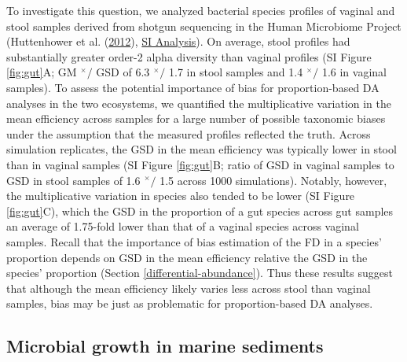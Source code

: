 \documentclass[
]{article}
\newcommand{\md}{^{\times}\!/}
\begin{document}
To investigate this question, we analyzed bacterial species profiles of vaginal and stool samples derived from shotgun sequencing in the Human Microbiome Project
(Huttenhower et al. (\protect\hyperlink{ref-huttenhower2012stru}{2012}), \href{https://mikemc.github.io/differential-abundance-theory/notebook/posts/2022-01-30-hmp-stool-vagina-comparison/}{SI Analysis}).
On average, stool profiles had substantially greater order-2 alpha diversity than vaginal profiles (SI Figure \ref{fig:gut}A; GM \(\md\) GSD of 6.3 \(\md\) 1.7 in stool samples and 1.4 \(\md\) 1.6 in vaginal samples).
To assess the potential importance of bias for proportion-based DA analyses in the two ecosystems, we quantified the multiplicative variation in the mean efficiency across samples for a large number of possible taxonomic biases under the assumption that the measured profiles reflected the truth.
Across simulation replicates, the GSD in the mean efficiency was typically lower in stool than in vaginal samples (SI Figure \ref{fig:gut}B; ratio of GSD in vaginal samples to GSD in stool samples of 1.6 \(\md\) 1.5 across 1000 simulations).
Notably, however, the multiplicative variation in species also tended to be lower (SI Figure \ref{fig:gut}C), which the GSD in the proportion of a gut species across gut samples an average of 1.75-fold lower than that of a vaginal species across vaginal samples.
Recall that the importance of bias estimation of the FD in a species' proportion depends on GSD in the mean efficiency relative the GSD in the species' proportion (Section \ref{differential-abundance}).
Thus these results suggest that although the mean efficiency likely varies less across stool than vaginal samples, bias may be just as problematic for proportion-based DA analyses.

\hypertarget{microbial-growth-in-marine-sediments}{%
\subsection{Microbial growth in marine sediments}\label{microbial-growth-in-marine-sediments}}
\end{document}
